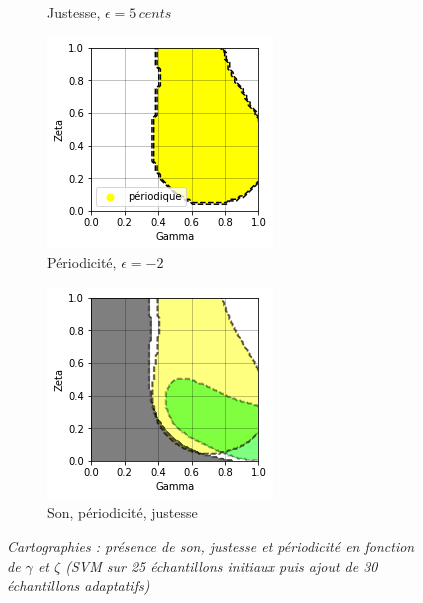 \documentclass[french, twocolumn]{article}
\begin{document}
\begin{figure}[h!]
\begin{subfigure}[b]{.49\linewidth}
        \caption{Justesse, $\epsilon = 5 \, cents$}
        \label{fig:Justesse}
    \end{subfigure}
    \hfill
    \begin{subfigure}[b]{.49\linewidth}
        \includegraphics[width=\linewidth]{img/periodicV2.png}
        \caption{Périodicité, $\epsilon = -2 $}
        \label{subfig:periodicité}
    \end{subfigure}
    \hfill
    \begin{subfigure}[b]{.49\linewidth}
        \includegraphics[width=\linewidth]{img/carto_tot_sauf_rugo.png}
        \caption{Son, périodicité, justesse}
        \label{subfig:tot1}
    \end{subfigure}
    \caption{\emph{Cartographies : présence de son, justesse et périodicité en fonction de $\gamma$ et $\zeta$ (SVM sur 25 échantillons initiaux puis ajout de 30 échantillons adaptatifs)}}
    \label{fig:cartographies}
\end{figure}
\end{document}

